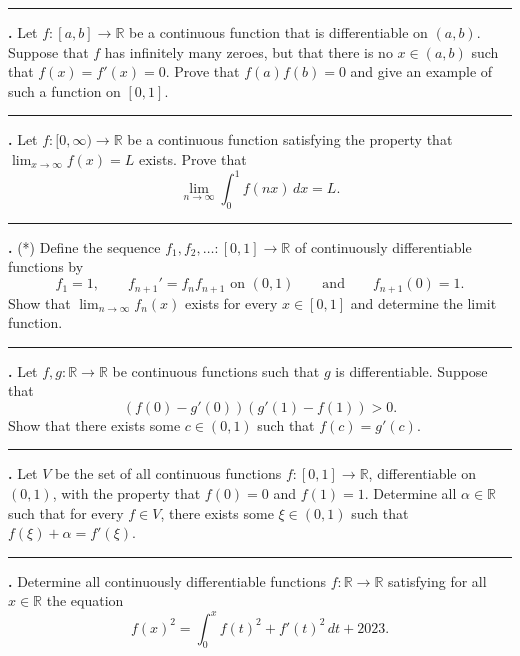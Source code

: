 \documentclass[11pt]{article}
\newcounter{probnum}
\newenvironment{problembox}{\par\noindent\rule{\linewidth}{0.5pt}\vspace{5pt}\par}{\vspace{2pt}}
\begin{document}
\begin{problembox}
\textbf{\theprobnum.} Let $f : [a,b] \to \mathbb{R}$ be a continuous function that is differentiable on $(a,b)$. Suppose that $f$ has infinitely many zeroes, but that there is no $x \in (a,b)$ such that $f(x) = f'(x) = 0$. Prove that $f(a) f(b) = 0$ and give an example of such a function on $[0,1]$.
\end{problembox}

\begin{problembox}
\textbf{\theprobnum.} Let $f : [0,\infty) \to \mathbb{R}$ be a continuous function satisfying the property that $\lim_{x \to \infty} f(x) = L$ exists. Prove that
\[
\lim_{n \to \infty} \int_0^1 f(nx)\,dx = L.
\]
\end{problembox}

\begin{problembox}
\textbf{\theprobnum.} (*) Define the sequence $f_1, f_2, \ldots : [0,1] \to \mathbb{R}$ of continuously differentiable functions by
\[
f_1 = 1, \qquad f_{n+1}' = f_n f_{n+1} \text{ on } (0,1) \qquad \text{and} \qquad f_{n+1}(0) = 1.
\]
Show that $\lim_{n \to \infty} f_n(x)$ exists for every $x \in [0,1]$ and determine the limit function.
\end{problembox}

\begin{problembox}
\textbf{\theprobnum.} Let $f, g : \mathbb{R} \to \mathbb{R}$ be continuous functions such that $g$ is differentiable. Suppose that
\[
(f(0) - g'(0))(g'(1) - f(1)) > 0.
\]
Show that there exists some $c \in (0,1)$ such that $f(c) = g'(c)$.
\end{problembox}

\begin{problembox}
\textbf{\theprobnum.} Let $V$ be the set of all continuous functions $f : [0,1] \to \mathbb{R}$, differentiable on $(0,1)$, with the property that $f(0) = 0$ and $f(1) = 1$. Determine all $\alpha \in \mathbb{R}$ such that for every $f \in V$, there exists some $\xi \in (0,1)$ such that $f(\xi) + \alpha = f'(\xi)$.
\end{problembox}

\begin{problembox}
\textbf{\theprobnum.} Determine all continuously differentiable functions $f : \mathbb{R} \to \mathbb{R}$ satisfying for all $x \in \mathbb{R}$ the equation
\[
f(x)^2 = \int_0^x f(t)^2 + f'(t)^2\,dt + 2023.
\]
\end{problembox}
\end{document}
